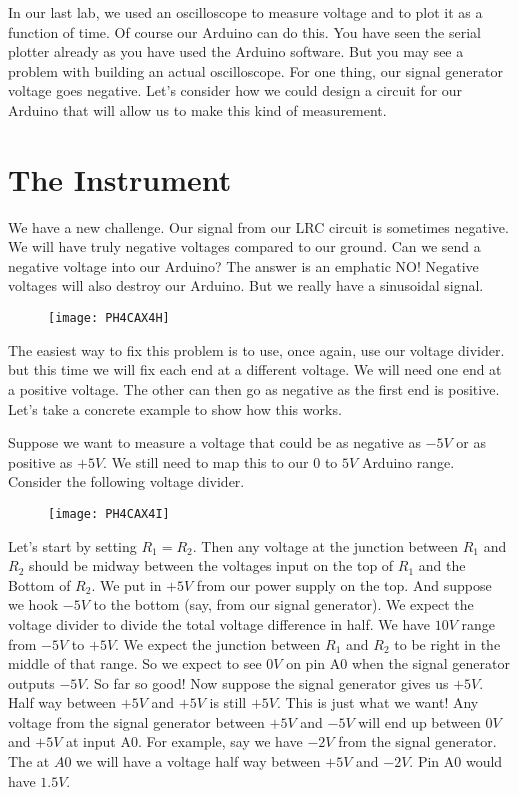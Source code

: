 In our last lab, we used an oscilloscope to measure voltage and to plot it
as a function of time. Of course our Arduino can do this. You have seen the
serial plotter already as you have used the Arduino software. But you may
see a problem with building an actual oscilloscope. For one thing, our
signal generator voltage goes negative. Let's consider how we could design a
circuit for our Arduino that will allow us to make this kind of measurement.

\section{The Instrument}

We have a new challenge. Our signal from our LRC circuit is sometimes
negative. We will have truly negative voltages compared to our ground. Can
we send a negative voltage into our Arduino? The answer is an emphatic NO!
Negative voltages will also destroy our Arduino. But we really have a
sinusoidal signal. \begin{figure}[h!]
\texttt{[image: PH4CAX4H]}
\end{figure}

The easiest way to fix this problem is to use, once again, use our voltage
divider. but this time we will fix each end at a different voltage. We will
need one end at a positive voltage. The other can then go as negative as the
first end is positive. Let's take a concrete example to show how this works.

Suppose we want to measure a voltage that could be as negative as $-5\unit{V}
$ or as positive as $+5\unit{V}.$ We still need to map this to our $0$ to $5%
\unit{V}$ Arduino range. Consider the following voltage divider.\begin{figure}[h!]
\texttt{[image: PH4CAX4I]}
\end{figure}

Let's start by setting $R_{1}=R_{2}.$ Then any voltage at the junction
between $R_{1}$ and $R_{2}$ should be midway between the voltages input on
the top of $R_{1}$ and the Bottom of $R_{2}.$ We put in $+5\unit{V}$ from
our power supply on the top. And suppose we hook $-5\unit{V}$ to the bottom
(say, from our signal generator). We expect the voltage divider to divide
the total voltage difference in half. We have $10\unit{V}$ range from $-5%
\unit{V}$ to $+5\unit{V}$. We expect the junction between $R_{1}$ and $R_{2}$
to be right in the middle of that range. So we expect to see $0\unit{V}$ on
pin A0 when the signal generator outputs $-5\unit{V}.$ So far so good! Now
suppose the signal generator gives us $+5\unit{V}.$ Half way between $+5%
\unit{V}$ and $+5\unit{V}$ is still $+5\unit{V}$. This is just what we want!
Any voltage from the signal generator between $+5\unit{V}$ and $-5\unit{V}$
will end up between $0\unit{V}$ and $+5\unit{V}$ at input A0. For example,
say we have $-2\unit{V}$ from the signal generator. The at $A0$ we will have
a voltage half way between $+5\unit{V}$ and $-2\unit{V}.$ Pin A0 would have $%
1.5\unit{V}.$

